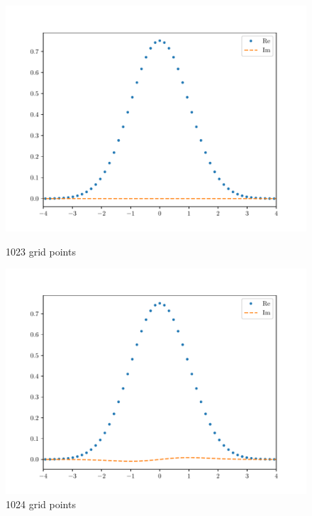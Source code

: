 \documentclass{article}
\begin{document}
\begin{enumerate}[1.]
\begin{enumerate}[(i)]
    \begin{figure}[H]
      \centering
      \begin{minipage}{0.32\linewidth}
        \centering
        \includegraphics[width=\linewidth]{q1-2-0.pdf}
        \caption*{1023 grid points}
      \end{minipage}
      \begin{minipage}{0.32\linewidth}
        \centering
        \includegraphics[width=\linewidth]{q1-2-1.pdf}
        \caption*{1024 grid points}
      \end{minipage}
      \begin{minipage}{0.32\linewidth}
        \centering

\end{minipage}
\end{figure}
\end{enumerate}
\end{enumerate}
\end{document}
